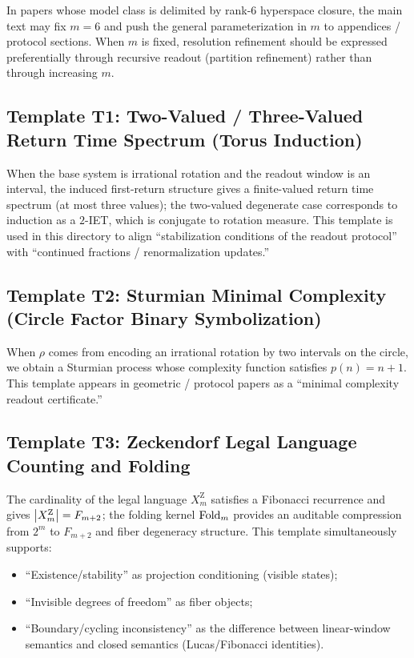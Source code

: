 \begin{remark}
In papers whose model class is delimited by rank-$6$ hyperspace closure, the main text may fix $m=6$ and push the general parameterization in $m$ to appendices / protocol sections. When $m$ is fixed, resolution refinement should be expressed preferentially through recursive readout (partition refinement) rather than through increasing $m$.
\end{remark}

\subsection{Template T1: Two-Valued / Three-Valued Return Time Spectrum (Torus Induction)}

When the base system is irrational rotation and the readout window is an interval, the induced first-return structure gives a finite-valued return time spectrum (at most three values); the two-valued degenerate case corresponds to induction as a $2$-IET, which is conjugate to rotation measure. This template is used in this directory to align ``stabilization conditions of the readout protocol'' with ``continued fractions / renormalization updates.''

\subsection{Template T2: Sturmian Minimal Complexity (Circle Factor Binary Symbolization)}

When $\rho$ comes from encoding an irrational rotation by two intervals on the circle, we obtain a Sturmian process whose complexity function satisfies $p(n)=n+1$.
This template appears in geometric / protocol papers as a ``minimal complexity readout certificate.''

\subsection{Template T3: Zeckendorf Legal Language Counting and Folding}

The cardinality of the legal language $X_m^{\mathrm Z}$ satisfies a Fibonacci recurrence and gives $\left\lvert X_m^{\mathrm Z}\right\rvert=F_{m+2}$;
the folding kernel $\mathrm{Fold}_m$ provides an auditable compression from $2^m$ to $F_{m+2}$ and fiber degeneracy structure.
This template simultaneously supports:
\begin{itemize}
  \item ``Existence/stability'' as projection conditioning (visible states);
  \item ``Invisible degrees of freedom'' as fiber objects;
  \item ``Boundary/cycling inconsistency'' as the difference between linear-window semantics and closed semantics (Lucas/Fibonacci identities).
\end{itemize}

